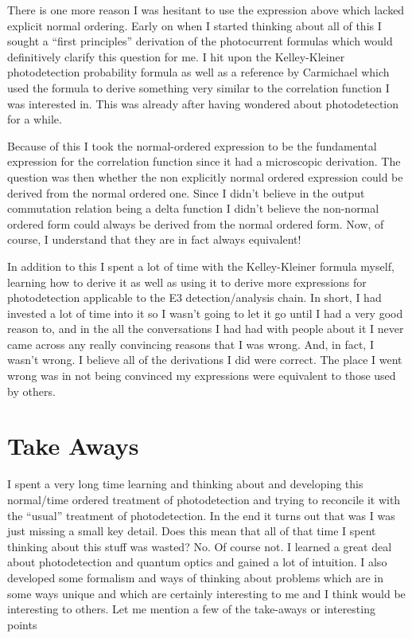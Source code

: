 \documentclass[12pt]{article}
\begin{document}
There is one more reason I was hesitant to use the expression above which lacked explicit normal ordering. Early on when I started thinking about all of this I sought a ``first principles'' derivation of the photocurrent formulas which would definitively clarify this question for me. I hit upon the Kelley-Kleiner photodetection probability formula as well as a reference by Carmichael which used the formula to derive something very similar to the correlation function I was interested in. This was already after having wondered about photodetection for a while.

Because of this I took the normal-ordered expression to be the fundamental expression for the correlation function since it had a microscopic derivation. The question was then whether the non explicitly normal ordered expression could be derived from the normal ordered one. Since I didn't believe in the output commutation relation being a delta function I didn't believe the non-normal ordered form could always be derived from the normal ordered form. Now, of course, I understand that they are in fact always equivalent!

In addition to this I spent a lot of time with the Kelley-Kleiner formula myself, learning how to derive it as well as using it to derive more expressions for photodetection applicable to the E3 detection/analysis chain. In short, I had invested a lot of time into it so I wasn't going to let it go until I had a very good reason to, and in the all the conversations I had had with people about it I never came across any really convincing reasons that I was wrong. And, in fact, I wasn't wrong. I believe all of the derivations I did were correct. The place I went wrong was in not being convinced my expressions were equivalent to those used by others.

\section{Take Aways}

I spent a very long time learning and thinking about and developing this normal/time ordered treatment of photodetection and trying to reconcile it with the ``usual'' treatment of photodetection. In the end it turns out that was I was just missing a small key detail. Does this mean that all of that time I spent thinking about this stuff was wasted? No. Of course not. I learned a great deal about photodetection and quantum optics and gained a lot of intuition. I also developed some formalism and ways of thinking about problems which are in some ways unique and which are certainly interesting to me and I think would be interesting to others. Let me mention a few of the take-aways or interesting points
\end{document}
